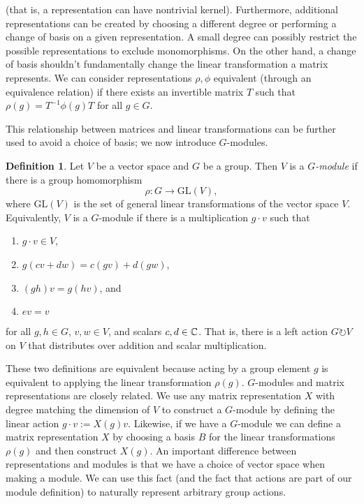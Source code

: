 \documentclass[12pt,twoside]{reedthesis}
\theoremstyle{plain}   %
\theoremstyle{definition}
\newtheorem{defn}{Definition}[section]
\theoremstyle{remark}
\numberwithin{equation}{section}
\def\GL{\mathrm{GL}} \def\SL{\mathrm{SL}}  \def\SP{\mathrm{SL}}\def\OG{\mathrm{O}}
\def\acts{\circlearrowright} %
\begin{document}
  (that is, a representation can have nontrivial kernel).
  Furthermore, additional representations can be created by choosing a different degree or performing a change of basis on a given representation.
  A small degree can possibly restrict the possible representations to exclude monomorphisms.
  On the other hand, a change of basis shouldn't fundamentally change the linear transformation a matrix represents.
  We can consider representations $\rho, \phi$ equivalent (through an equivalence relation) if there exists an invertible matrix $T$
  such that $\rho(g) = T^{-1} \phi(g) T$ for all $g \in G$.\par
  This relationship between matrices and linear transformations can be further used to avoid a choice of basis; we now introduce
  $G$-modules.
  \begin{defn}
    Let $V$ be a vector space and $G$ be a group. Then $V$ is a \emph{$G$-module} if there is a group homomorphism
    \[\rho: G \to \GL(V),\]
    where $\GL(V)$ is the set of general linear transformations of the vector space $V$.
    Equivalently, $V$ is a $G$-module if there is a multiplication $g \cdot v$ such that
    \begin{enumerate}
    \item $g \cdot v \in V$,
    \item $g(cv + dw) = c(gv) + d(gw)$,
    \item $(gh)v = g(hv)$, and
    \item $ev = v$
    \end{enumerate}
    for all $g,h \in G$, $v,w \in V$, and scalars $c,d \in \mathbb{C}$.
    That is, there is a left action $G \acts V$ on $V$ that distributes over addition and scalar multiplication.
  \end{defn}
  These two definitions are equivalent because acting by a group element $g$ is equivalent to applying the linear transformation $\rho(g)$.
  $G$-modules and matrix representations are closely related. We use any matrix representation $X$ with degree matching the dimension of $V$
  to construct a $G$-module by defining the linear action $g \cdot v := X(g) v$. Likewise, if we have a $G$-module we can define
  a matrix representation $X$ by choosing a basis $B$ for the linear transformations $\rho(g)$ and then construct $X(g)$.
  An important difference between representations and modules is that we have a choice of vector space when making a module.
  We can use this fact (and the fact that actions are part of our module definition) to naturally represent arbitrary group actions.
\end{document}
